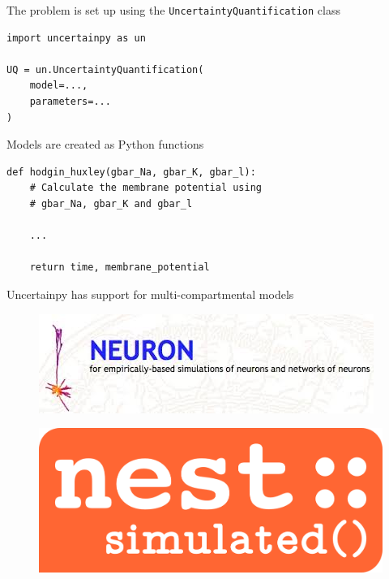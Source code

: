 \documentclass[presentation]{beamer}
\begin{document}

\begin{frame}[fragile]{The problem is set up using the
            \lstinline|UncertaintyQuantification| class}


  \begin{lstlisting}
import uncertainpy as un

UQ = un.UncertaintyQuantification(
    model=...,
    parameters=...
)
  \end{lstlisting}
\end{frame}






\begin{frame}[fragile]{Models are created as Python functions}


  \begin{lstlisting}
def hodgin_huxley(gbar_Na, gbar_K, gbar_l):
    # Calculate the membrane potential using
    # gbar_Na, gbar_K and gbar_l

    ...

    return time, membrane_potential
  \end{lstlisting}

\end{frame}



\begin{frame}[fragile]{Uncertainpy has support for multi-compartmental models
  }
  \vspace{-2mm}

  \begin{figure}
    \includegraphics[height=0.3\textheight]{neuron.jpeg}
  \end{figure}
  \pause
  \begin{figure}
    \includegraphics[height=0.25\textheight]{nest.png}
  \end{figure}

\end{frame}
\end{document}

